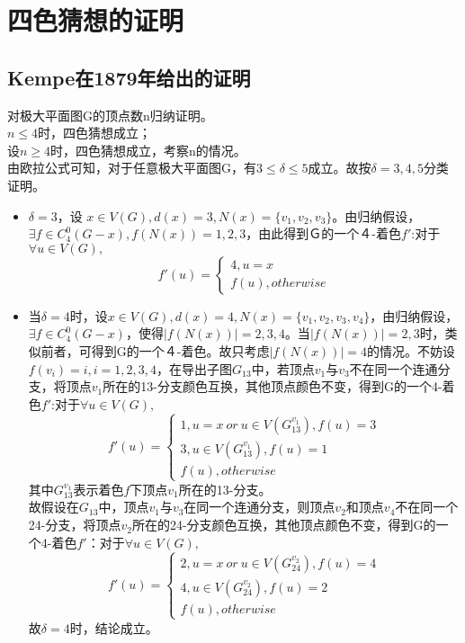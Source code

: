 \documentclass[12pt, UTF8]{ctexart}
\begin{document}
\section{四色猜想的证明}

\subsection{Kempe在1879年给出的证明}
对极大平面图G的顶点数n归纳证明。\\
$n \leq 4$时，四色猜想成立；\\
设$n \ge 4$时，四色猜想成立，考察n的情况。\\
由欧拉公式可知，对于任意极大平面图G，有$3 \leq \delta \leq 5$成立。故按$\delta = 3,4,5$分类证明。
\begin{itemize}
\item $\delta = 3$，设 $x \in V(G), d(x)=3, N(x)=\{v_1,v_2,v_3\}$。由归纳假设，$\exists f \in C^0_4(G-x), f(N(x)) = {1, 2, 3}$，由此得到Ｇ的一个４-着色$f'$:对于$\forall u \in V(G),$
\[
    f'(u) = \begin{cases}
        4, u = x \\
        f(u), otherwise 
    \end{cases}
\]
\item 当$\delta=4$时，设$x \in V(G), d(x) = 4, N(x) = \{v_1, v_2, v_3, v_4\}$，由归纳假设，$\exists f \in C^0_4(G-x)$，使得$|f(N(x))|=2,3,4$。当$|f(N(x))|=2,3$时，类似前者，可得到G的一个４-着色。故只考虑$|f(N(x))|=4$的情况。不妨设$f(v_i)=i, i=1,2,3,4$，在导出子图$G_{13}$中，若顶点$v_1$与$v_3$不在同一个连通分支，将顶点$v_1$所在的13-分支颜色互换，其他顶点颜色不变，得到G的一个4-着色$f'$:对于$\forall u \in V(G),$
\[
    f'(u) = \begin{cases}
        1, u = x\ or\ u \in V(G_{13}^{v_1}), f(u) = 3\\
        3, u \in V(G_{13}^{v_1}), f(u) = 1\\
        f(u), otherwise 
    \end{cases}
\]
其中$G_{13}^{v_1}$表示着色$f$下顶点$v_1$所在的13-分支。\\
故假设在$G_{13}$中，顶点$v_1$与$v_3$在同一个连通分支，则顶点$v_2$和顶点$v_4$不在同一个24-分支，将顶点$v_2$所在的24-分支颜色互换，其他顶点颜色不变，得到G的一个4-着色$f'$：对于$\forall u \in V(G),$
\[
    f'(u) = \begin{cases}
        2, u = x\ or\ u \in V(G_{24}^{v_2}), f(u) = 4\\
        4, u \in V(G_{24}^{v_2}), f(u) = 2\\
        f(u), otherwise
    \end{cases}
\]
故$\delta = 4$时，结论成立。


\end{itemize}
\end{document}
